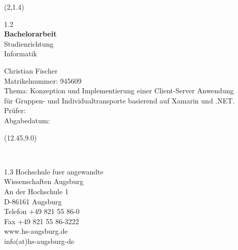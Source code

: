 \documentclass{wissdoc}
\begin{document}

\begin{textblock}{15}(2,1.4)
	\begin{flushleft}
		\begin{spacing} {1.2}
			\huge	
				\textcolor[rgb]{1,0.41,0.13}{\\
				\textbf{Bachelorarbeit}}\\
				\vspace{60pt}
			\LARGE
				Studienrichtung\\
				Informatik\\
				\vspace{40pt}
				
				Christian Fischer\\
				\vspace{30pt}		
				Matrikelnummer: 945609\\
				\vspace{30pt}
				Thema: Konzeption und Implementierung einer Client-Server Anwendung\\ f\"ur Gruppen- und Individualtransporte basierend auf Xamarin und .NET.\\
				\vspace{60pt}		
			\LARGE
				Pr\"ufer: \\
				\vspace{10pt}		
				Abgabedatum: \\
			\end{spacing}
		\end{flushleft}
		
\end{textblock}



\begin{textblock}{5}(12.45,9.0)
	\scriptsize
	\textcolor[rgb]{1,0,0}{\\
		\begin{flushleft}
			\begin{spacing} {1.3}
				Hochschule fuer angewandte\\
				Wissenschaften Augsburg\\
				\vspace{4pt}
				An der Hochschule 1\\
				D-86161 Augsburg\\
				\vspace{4pt}
				Telefon +49 821 55 86-0\\
				Fax +49 821 55 86-3222\\
				www.hs-augsburg.de\\
				info(at)hs-augsburg-de
			\end{spacing}
		\end{flushleft}
		}
\end{textblock}
\end{document}
